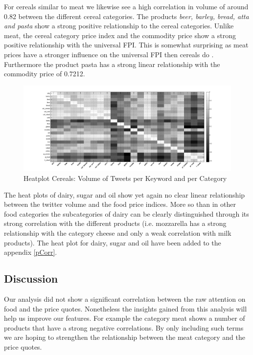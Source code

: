 For cereals similar to meat we likewise see a high correlation in volume of around 0.82 between the different cereal categories. The products \emph{beer, barley, bread, atta and pasta} show a strong positive relationship to the cereal categories. Unlike meat, the cereal category price index and the commodity price show a strong positive relationship with the universal FPI. This is somewhat surprising as meat prices have a stronger influence on the universal FPI then cereals do \cite{fao2008}. Furthermore the product pasta has a strong linear relationship with the commodity price of 0.7212.
\begin{figure}[H]
        \centering
         \includegraphics[width=1\textwidth ]{img/anal/black_cereals}
              
        \caption{Heatplot Cereals: Volume of Tweets per Keyword and per Category}
        \label{fig:distribution}
\end{figure}
 

The heat plots of dairy, sugar and oil show yet again no clear linear relationship between the twitter volume and the food price indices. More so than in other food categories the subcategories of dairy can be clearly distinguished through its strong correlation with the different products (i.e. mozzarella has a strong relationship with the category cheese and only a weak correlation with milk products). The heat plot for dairy, sugar and oil have been added to the appendix \ref{pCorr}.



\subsection{Discussion} 

Our analysis did not show a significant correlation between the raw attention on food and the price quotes.
Nonetheless the insights gained from this analysis will help us improve our features. For example the category meat shows a number of products that have a strong negative correlations. By only including such terms we are hoping to strengthen the relationship between the meat category and the price quotes.

